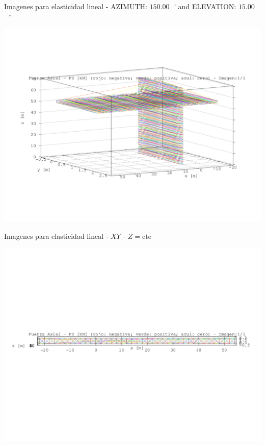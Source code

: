 \documentclass[a4paper,11pt]{article}
\newcommand{\grad}{\hspace{-2.5mm}$\,\phantom{a}^{\circ}\,$}
\begin{document}
\newpage       
\begin{center}       
Imagenes para elasticidad lineal - AZIMUTH: $150.00$\grad and ELEVATION: $ 15.00$\grad

\includegraphics[width=.80\textwidth]{../../fuerza_axial/grua_fuerza_axial_1.png}      

\end{center}       
\newpage       
\begin{center}       
Imagenes para elasticidad lineal -  $XY$ - $Z=\text{cte}$ 

\includegraphics[width=.80\textwidth]{../../XY_XZ_YZ/XY/fuerza_axial/grua_fuerza_axial_XY_1.png}      

\end{center}       
\newpage       
\end{document}
